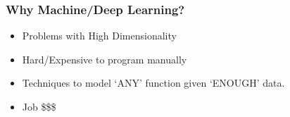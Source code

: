 \begin{frame}[fragile]\frametitle{Why Machine/Deep Learning?}
\begin{itemize}
\item Problems with High Dimensionality
\item Hard/Expensive to program manually
\item Techniques to model `ANY' function given `ENOUGH' data.
\item Job \$\$\$
\end{itemize}
\end{frame}






